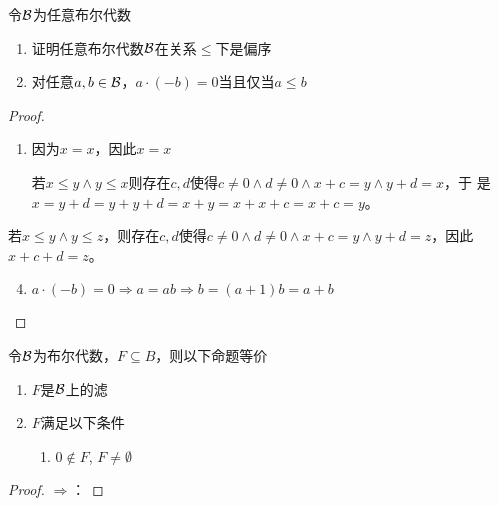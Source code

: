 \documentclass[11pt]{article}
\begin{document}
\begin{exercise}[3.1.10]
令\(\mathcal{B}\)为任意布尔代数
\begin{enumerate}
\item 证明任意布尔代数\(\mathcal{B}\)在关系\(\le\)下是偏序
\setcounter{enumi}{3}
\item 对任意\(a,b\in\mathcal{B}\)，\(a\cdot(-b)=0\)当且仅当\(a\le b\)
\end{enumerate}
\end{exercise}

\begin{proof}
\begin{enumerate}
\item 因为\(x=x\)，因此\(x=x\)

若\(x\le y\wedge y\le x\)则存在\(c,d\)使得\(c\neq 0\wedge d\neq 0\wedge x+c=y\wedge y+d=x\)，于
是\(x=y+d=y+y+d=x+y=x+x+c=x+c=y\)。
\end{enumerate}


若\(x\le y\wedge y\le z\)，则存在\(c,d\)使得\(c\neq 0\wedge d\neq 0\wedge x+c=y\wedge y+d=z\)，因此\(x+c+d=z\)。

\begin{enumerate}
\setcounter{enumi}{3}
\item \(a\cdot(-b)=0\Rightarrow a=ab\Rightarrow b=(a+1)b=a+b\)
\end{enumerate}
\end{proof}


\begin{exercise}[3.1.7]
令\(\mathcal{B}\)为布尔代数，\(F\subseteq B\)，则以下命题等价
\begin{enumerate}
\item \(F\)是\(\mathcal{B}\)上的滤
\item \(F\)满足以下条件
\begin{enumerate}
\item \(0\notin F\), \(F\neq\emptyset\)
\end{enumerate}
\end{enumerate}
\end{exercise}

\begin{proof}
\(\Rightarrow\)：
\end{proof}
\end{document}

